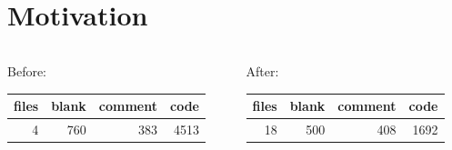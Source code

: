 \documentclass[aspectratio=169, 10pt, handout]{beamer}
\begin{document}
\whitetheme

\section{Motivation}
\label{sec:org69709a0}
\begin{frame}[label={sec:org2b68947}]{}
\begin{columns}
\begin{column}{0.38\columnwidth}
Before:
\begin{center}
\begin{tabular}{rrrr}
files & blank & comment & code\\
\hline
4 & 760 & 383 & 4513\\
\end{tabular}
\end{center}
\end{column}
\begin{column}{0.38\columnwidth}
After:
\begin{center}
\begin{tabular}{rrrr}
files & blank & comment & code\\
\hline
18 & 500 & 408 & 1692\\
\end{tabular}
\end{center}
\end{column}
\end{columns}
\end{frame}
\end{document}
